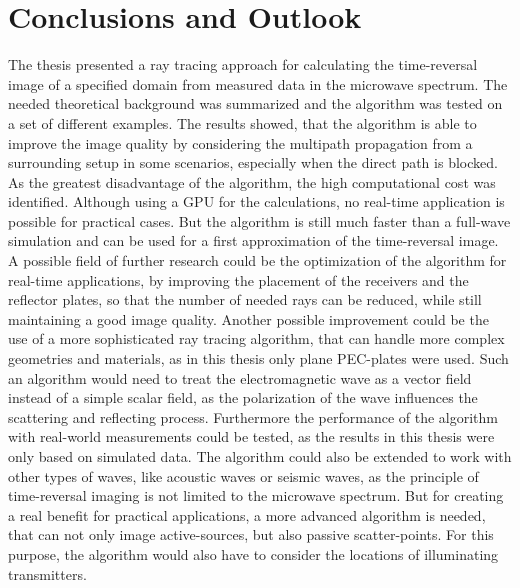 
\chapter{Conclusions and Outlook}\label{chapter:conclusions}
The thesis presented a ray tracing approach for calculating the time-reversal image of a specified domain from measured data in the microwave spectrum.
The needed theoretical background was summarized and the algorithm was tested on a set of different examples.
The results showed, that the algorithm is able to improve the image quality by considering the multipath propagation from a surrounding setup in some scenarios, especially when the direct path is blocked.
As the greatest disadvantage of the algorithm, the high computational cost was identified.
Although using a GPU for the calculations, no real-time application is possible for practical cases.
But the algorithm is still much faster than a full-wave simulation and can be used for a first approximation of the time-reversal image.
A possible field of further research could be the optimization of the algorithm for real-time applications, by improving the placement of the receivers and the reflector plates, so that the number of needed rays can be reduced, while still maintaining a good image quality.
Another possible improvement could be the use of a more sophisticated ray tracing algorithm, that can handle more complex geometries and materials, as in this thesis only plane PEC-plates were used.
Such an algorithm would need to treat the electromagnetic wave as a vector field instead of a simple scalar field, as the polarization of the wave influences the scattering and reflecting process.
Furthermore the performance of the algorithm with real-world measurements could be tested, as the results in this thesis were only based on simulated data.
The algorithm could also be extended to work with other types of waves, like acoustic waves or seismic waves, as the principle of time-reversal imaging is not limited to the microwave spectrum.
But for creating a real benefit for practical applications, a more advanced algorithm is needed, that can not only image active-sources, but also passive scatter-points.
For this purpose, the algorithm would also have to consider the locations of illuminating transmitters.



